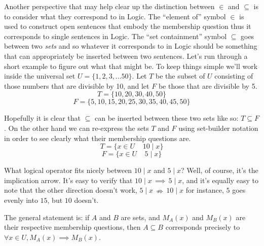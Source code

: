 \documentclass[10pt,]{book}
\theoremstyle{plain}
\theoremstyle{definition}
\theoremstyle{definition}
\numberwithin{equation}{section}
\newcommand{\suchthat}{\;  \;}
\newcommand{\divides}{\!\mid\!}
\begin{document}
    Another perspective that may help clear up the distinction between
    \(\in\) and \(\subseteq\) is to consider what they correspond to in Logic.
    The ``element of'' symbol \(\in\) is used to construct open sentences
    that embody the membership question \textemdash{} thus it corresponds to single
    sentences in Logic. The ``set containment'' symbol \(\subseteq\) goes
    between two \emph{sets} and so whatever it corresponds to in Logic
    should be something that can appropriately be inserted between two
    sentences. Let's run through a short example to figure out what that
    might be. To keep things
    simple we'll work inside the universal set \(U=\{ 1, 2, 3, \ldots 50 \}\).
    Let \(T\) be the subset of \(U\) consisting of those numbers that are
    divisible by 10, and let \(F\) be those that are divisible by 5.
    \begin{equation*}
      T = \{10, 20, 30, 40, 50 \}
    \end{equation*}
    \begin{equation*}
      F = \{5, 10, 15, 20, 25, 30, 35, 40, 45, 50 \}
    \end{equation*}
\par

    Hopefully it is clear that \(\subseteq\) can be inserted between these two sets
    like so: \(T \subseteq F\).
    On the other hand we can re-express the sets \(T\) and \(F\) using set-builder
    notation in order to see clearly what their membership questions are.
    \begin{equation*}
      T = \{ x \in U \; \suchthat \; 10\divides x \}
    \end{equation*}
    \begin{equation*}
      F = \{ x \in U \; \suchthat \; 5\divides x \}
    \end{equation*}
\par

    What logical operator fits nicely between \(10\divides x\) and \(5\divides x\)?
    Well, of course, it's the implication arrow. It's easy to
    verify that \(10\divides x \, \implies \, 5\divides x\), and it's equally easy
    to note that the other direction doesn't work, \(5\divides x \, \nRightarrow \, 10\divides x\) \textemdash{} for instance, \(5\) goes evenly into \(15\), but \(10\) doesn't.
\par

    The general statement is: if \(A\) and \(B\) are sets, and \(M_A(x)\) and \(M_B(x)\)
    are their respective membership questions, then \(A \subseteq B\) corresponds
    precisely to \(\forall x \in U, M_A(x) \implies M_B(x)\).
\par
\end{document}
